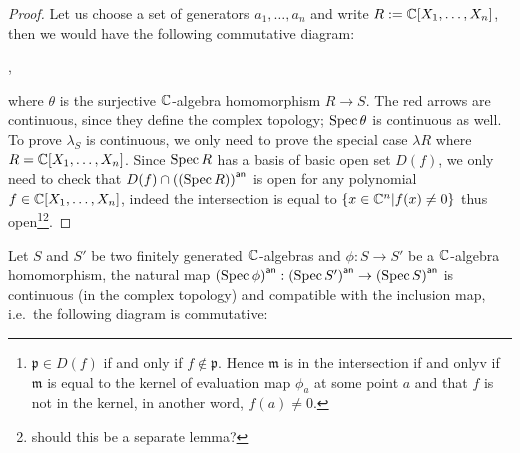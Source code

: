 \begin{proof}
  Let us choose a set of generators $a_{1},\dots, a_{n}$ and write $R := \mathbb{C}[X_{1},\dots, X_{n}]$, then we would have the following commutative diagram:

  \begin{center}
    ,
  \end{center}
  where $\theta$ is the surjective $\mathbb{C}$-algebra homomorphism $R \to S$.
  The red arrows are continuous, since they define the complex topology; $\operatorname{Spec} \theta$ is continuous as well. To prove $\lambda_{S}$ is continuous, we only need to prove the special case $\lambda R$ where $R = \mathbb{C}[X_{1},\dots, X_{n}]$. Since $\operatorname{Spec} R$ has a basis of basic open set $D(f)$, we only need to check that $D(f) \cap \left({\left(\operatorname{Spec} R\right)}\right)^{\mathsf{an}}$ is open for any polynomial $f \in \mathbb{C}[X_{1}, \dots, X_{n}]$, indeed the intersection is equal to $\{x \in \mathbb{C}^{n}| f(x) \ne 0 \}$ thus open\footnote{$\mathfrak{p} \in D(f)$ if and only if $f \not\in \mathfrak{p}$. Hence $\mathfrak{m}$ is in the intersection if and onlyv if $\mathfrak{m}$ is equal to the kernel of evaluation map $\phi_{a}$ at some point $a$ and that $f$ is not in the kernel, in another word, $f(a) \ne 0$.}\footnote{should this be a separate lemma?}. %
\end{proof}

\begin{theorem}
  Let $S$ and $S'$ be two finitely generated $\mathbb{C}$-algebras and $\phi : S \to S'$ be a $\mathbb{C}$-algebra homomorphism, the natural map $\left({\operatorname{Spec}{\phi}}\right)^{\mathsf{an}} : \left({\operatorname{Spec}{S'}}\right)^{\mathsf{an}} \to \left({\operatorname{Spec}{S}}\right)^{\mathsf{an}}$ is continuous (in the complex topology)
  and compatible with the inclusion map, i.e.~the following diagram is commutative:
  \begin{center}
  \end{center}
\end{theorem}

